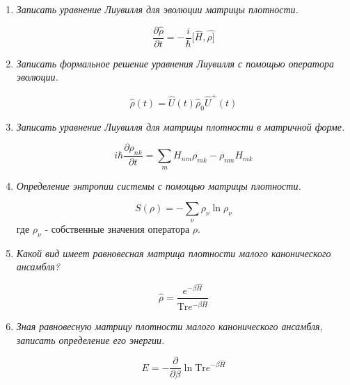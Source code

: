 \documentclass{article}
\begin{document}
\begin{enumerate}
	\item \textit{Записать уравнение Лиувилля для эволюции матрицы плотности.}
	
	\begin{equation}
		\frac{\partial \hat{\rho}}{\partial t} = -\frac{i}{\hbar} [\hat{H}, \hat{\rho]}
	\end{equation}
	
	\item \textit{Записать формальное решение уравнения Лиувилля с помощью оператора эволюции.}
	
	\begin{equation}
		\hat{\rho}(t) = \hat{U}(t)\hat{\rho}_0 \hat{U}^+(t)
	\end{equation}
	
	\item \textit{Записать уравнение Лиувилля для матрицы плотности в матричной форме.}
	
	\begin{equation}
		i\hbar \frac{\partial \rho_{nk}}{\partial t} = \sum\limits_{m} H_{nm}\rho_{mk} - \rho_{nm}H_{mk}
	\end{equation}
	
	\item \textit{Определение энтропии системы с помощью матрицы плотности.}
	
	\begin{equation}
		S(\rho) = -\sum\limits_{\nu} \rho_\nu \ln \rho_\nu
	\end{equation}
	где $\rho_\nu$ - собственные значения оператора $\rho$.
	
	\item \textit{Какой вид имеет равновесная матрица плотности малого канонического ансамбля?}
	
	\begin{equation}
		\hat{\rho} = \frac{e^{-\beta\hat{H}}}{\text{Tr}e^{-\beta\hat{H}}}
	\end{equation}
	
	\item \textit{Зная равновесную матрицу плотности малого канонического ансамбля, записать определение его энергии.}
	
	\begin{equation}
		E = - \frac{\partial}{\partial \beta} \ln \text{Tr}e^{-\beta\hat{H}}
	\end{equation}
\end{enumerate}
\end{document}
